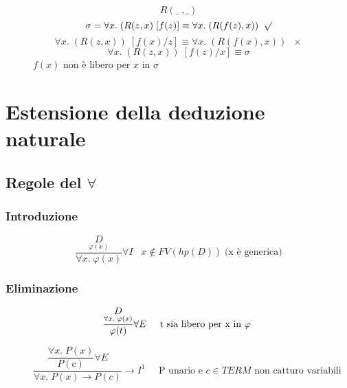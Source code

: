 \documentclass{article}
\theoremstyle{break}
\theoremstyle{break}
\theoremstyle{break}
\theoremstyle{break}
\begin{document}
\begin{figure}[H]
  \begin{example}
    \[
      R(\_\;,\_)
    \] 
    \[
      \sigma=\forall x.\;(R(z,x)\;[f(z)] \equiv \forall x.\; (R(f(z),x)) \;\;\surd
    \] 
    \[
      \forall x.\; (R(z,x))\;[f(x)/z] \equiv \forall x.\; (R(f(x),x)) \;\;\times
    \] 
    \[
      \forall x.\; (R(z,x))\;[f(z)/x] \equiv \sigma
    \] 
    \( f(x) \) non è libero per \( x \) in \( \sigma \)
  \end{example}
\end{figure}

\section{Estensione della deduzione naturale}
\subsection{Regole del \texorpdfstring{\( \forall  \)}{per ogni}}
\subsubsection{Introduzione}
\large\[
  \frac{\underset{\varphi(x)}{D}}{\forall x.\; \varphi(x)}\forall I \;\;\; x \notin FV(hp(D))\; \text{(x è generica)}
\]
\subsubsection{Eliminazione}
\large\[
  \frac{\underset{\forall x.\; \varphi(x)}{D}}{\varphi(t)} \forall E \;\;\;\;\; \text{t sia libero per x in \( \varphi \) }
\] 
\begin{figure}[H]
  \begin{exercise}
    \[
      \dfrac{\dfrac{\forall x.\; P(x)}{P(c)}\forall E}{\forall x.\; P(x) \to P(c)} \to I^1 \;\;\;\;\; \text{P unario e \(c \in TERM \) non catturo variabili }
    \] 
  \end{exercise}
\end{figure}
\end{document}
